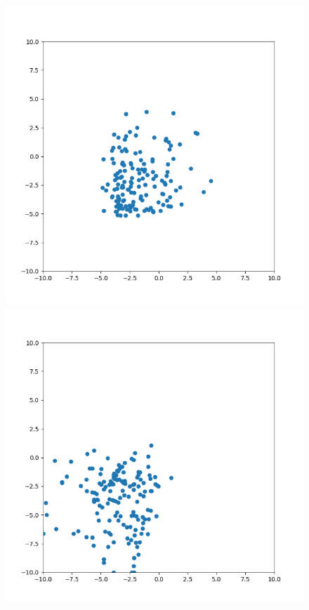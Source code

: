 \documentclass[conference]{IEEEtran}
\begin{document}
	\begin{figure}[htbp]
    \begin{center}
    	\includegraphics[scale=0.3]{imagens-pso/particle-swarm-optimization-leader-moving-01.png}
    	\includegraphics[scale=0.3]{imagens-pso/particle-swarm-optimization-leader-moving-02.png}

\end{center}
\end{figure}
\end{document}
